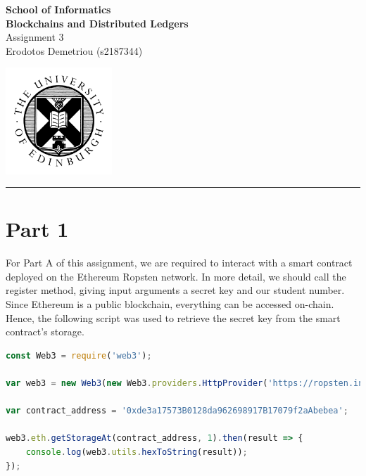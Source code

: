\documentclass[12pt,a4paper]{article}
\begin{document}
\noindent
\begin{minipage}{120mm}
        {\huge {\bf School of Informatics}}\\
        {\Large {\bf Blockchains and Distributed Ledgers}}\\

        {\Large Assignment 3}\\
        {\normalsize Erodotos Demetriou (s2187344)}
\end{minipage}
\hfill
\begin{minipage}{40mm}              
        \includegraphics[width=40mm]{crest.png}
\end{minipage}

\begin{center}
\rule{\linewidth}{0.5mm}
\end{center}

\section*{Part 1}

For Part A of this assignment, we are required to interact with a smart contract
deployed on the Ethereum Ropsten network. In more detail, we should call the
register method, giving input arguments a secret key and our student number.
Since Ethereum is a public blockchain, everything can be accessed on-chain.
Hence, the following script was used to retrieve the secret key from the smart
contract's storage. \\

\begin{lstlisting}[language=JavaScript]
const Web3 = require('web3');

var web3 = new Web3(new Web3.providers.HttpProvider('https://ropsten.infura.io/v3/0ab1814012ad4231965d67bf98a40b1a'));

var contract_address = '0xde3a17573B0128da962698917B17079f2aAbebea';

web3.eth.getStorageAt(contract_address, 1).then(result => {
    console.log(web3.utils.hexToString(result));
});
\end{lstlisting} 
\end{document}
